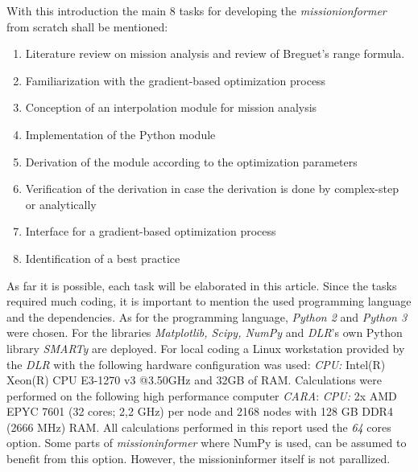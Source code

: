 With this introduction the main 8 tasks for 
developing the \emph{missionionformer} from scratch shall be mentioned:
\begin{enumerate}
    \item Literature review on mission analysis and review of Breguet's range formula.
    \item Familiarization with the gradient-based optimization process
    \item Conception of an interpolation module for mission analysis
    \item Implementation of the Python module
    \item Derivation of the module according to the optimization parameters
    \item Verification of the derivation in case the derivation is done by complex-step or analytically
    \item Interface for a gradient-based optimization process
    \item Identification of a best practice
  \end{enumerate}
As far it is possible, each task will be 
elaborated in this article. Since the tasks required much coding, 
it is important to 
mention the used programming language and the dependencies. 
As for the programming language,
\emph{Python 2} and \emph{Python 3} were chosen. For the libraries  
\emph{Matplotlib, Scipy, NumPy} and \emph{DLR}'s own 
Python library \emph{SMARTy} are deployed. For local coding a 
Linux workstation provided 
by the \emph{DLR} with the following hardware configuration 
was used: \emph{CPU:} Intel(R) Xeon(R)
CPU E3-1270 v3 @3.50GHz 
and 32GB of RAM. Calculations were performed on the  following high 
performance computer \emph{CARA}: \emph{CPU:} 2x AMD EPYC 7601 
(32 cores; 2,2 GHz) per node 
and 2168 nodes with 128 GB DDR4 (2666 MHz) RAM. 
All calculations performed in 
this report used the \emph{64} cores option. Some 
parts of \emph{missioninformer} where NumPy is used, can 
be assumed to benefit from this option. However, the 
missioninformer itself is not parallized.

